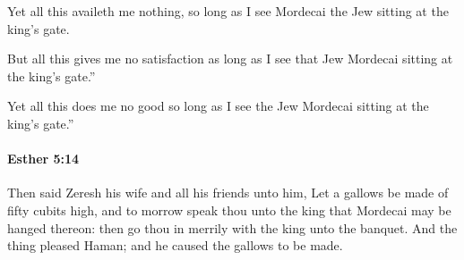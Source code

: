 			\begin{versebox}
					\item[BHS] 
					\item[LXX] 
					\item[ASV] Yet all this availeth me nothing, so long as I see Mordecai the Jew sitting at the king's gate.
					\item[NIV] But all this gives me no satisfaction as long as I see that Jew Mordecai sitting at the king’s gate.”
					\item[NRSV] Yet all this does me no good so long as I see the Jew Mordecai sitting at the king’s gate.”
			\end{versebox}

		\paragraph{Esther 5:14} %
			\label{ESTHER-5-14}

			Then said Zeresh his wife and all his friends unto him, Let a gallows be made of fifty cubits high, and to morrow speak thou unto the king that Mordecai may be hanged thereon: then go thou in merrily with the king unto the banquet. And the thing pleased Haman; and he caused the gallows to be made.

